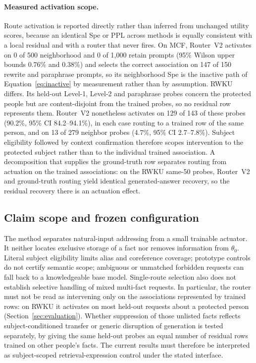 \documentclass{article}
\begin{document}
\paragraph{Measured activation scope.}
Route activation is reported directly rather than inferred from unchanged
utility scores, because an identical Spe or PPL across methods is equally
consistent with a local residual and with a router that never fires. On MCF,
Router~V2 activates on 0 of 500 neighborhood and 0 of 1,000 retain prompts
(95\% Wilson upper bounds 0.76\% and 0.38\%) and selects the correct
association on 147 of 150 rewrite and paraphrase prompts, so its neighborhood
Spe is the inactive path of Equation~\eqref{eq:inactive} by measurement rather
than by assumption. RWKU differs. Its held-out Level-1, Level-2 and paraphrase
probes concern the protected people but are content-disjoint from the trained
probes, so no residual row represents them. Router~V2 nonetheless activates on
129 of 143 of these probes (90.2\%, 95\% CI 84.2--94.1\%), in each case routing
to a trained row of the same person, and on 13 of 279 neighbor probes (4.7\%,
95\% CI 2.7--7.8\%). Subject eligibility followed by context confirmation
therefore scopes intervention to the protected subject rather than to the
individual trained association. A decomposition that supplies the ground-truth
row separates routing from actuation on the trained associations: on the
RWKU same-50 probes, Router~V2 and ground-truth routing yield identical
generated-answer recovery, so the residual recovery there is an actuation
effect.

\subsection{Claim scope and frozen configuration}
\label{sec:claims}

The method separates natural-input addressing from a small trainable actuator.
It neither locates exclusive storage of a fact nor removes information from
$\theta_0$. Literal subject eligibility limits alias and coreference coverage;
prototype controls do not certify semantic scope; ambiguous or unmatched
forbidden requests can fall back to a knowledgeable base model. Single-route
selection also does not establish selective handling of mixed multi-fact
requests. In particular, the router must not be read as intervening only on
the associations represented by trained rows: on RWKU it activates on most
held-out requests about a protected person
(Section~\ref{sec:evaluation}). Whether suppression of those unlisted facts
reflects subject-conditioned transfer or generic disruption of generation is
tested separately, by giving the same held-out probes an equal number of
residual rows trained on other people's facts.
The current results must therefore be interpreted as subject-scoped
retrieval-expression control under the stated interface.
\end{document}
